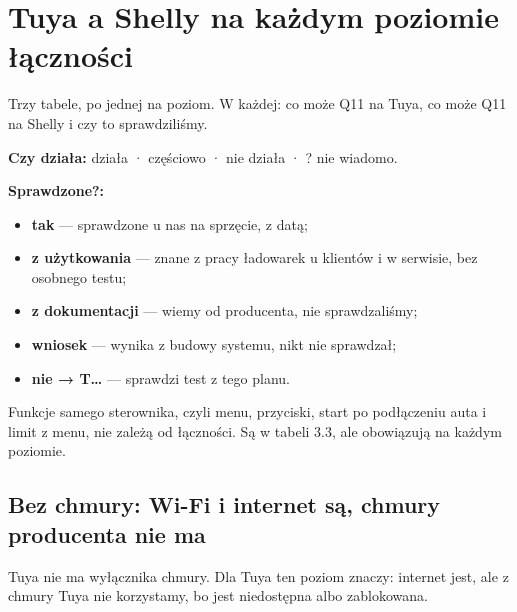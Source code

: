 \documentclass[11pt,a4paper]{article}
\begin{document}
\section{Tuya a Shelly na każdym poziomie łączności}

Trzy tabele, po jednej na poziom. W każdej: co może Q11 na Tuya, co może Q11 na Shelly i czy to sprawdziliśmy.


\textbf{Czy działa:}  działa ·  częściowo ·  nie działa · ? nie wiadomo.


\textbf{Sprawdzone?:}

\begin{itemize}
\item \textbf{tak} — sprawdzone u nas na sprzęcie, z datą;
\item \textbf{z użytkowania} — znane z pracy ładowarek u klientów i w serwisie, bez osobnego testu;
\item \textbf{z dokumentacji} — wiemy od producenta, nie sprawdzaliśmy;
\item \textbf{wniosek} — wynika z budowy systemu, nikt nie sprawdzał;
\item \textbf{nie {\symbolfont→} T…} — sprawdzi test z tego planu.
\end{itemize}

Funkcje samego sterownika, czyli menu, przyciski, start po podłączeniu auta i limit z menu, nie zależą od łączności. Są w tabeli 3.3, ale obowiązują na każdym poziomie.


\subsection{Bez chmury: Wi-Fi i internet są, chmury producenta nie ma}

Tuya nie ma wyłącznika chmury. Dla Tuya ten poziom znaczy: internet jest, ale z chmury Tuya nie korzystamy, bo jest niedostępna albo zablokowana.
\end{document}
